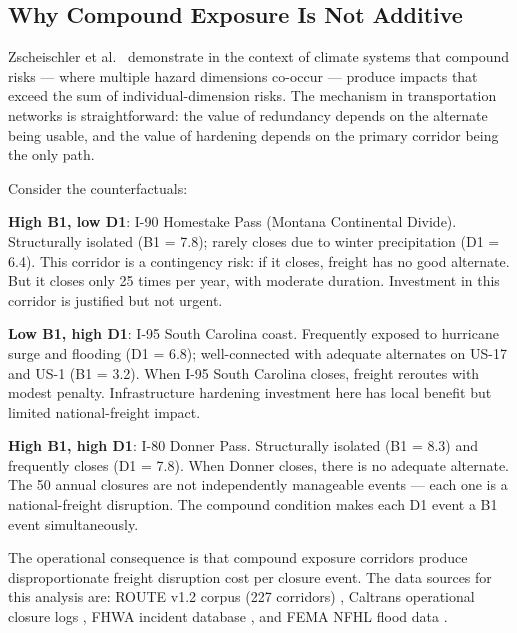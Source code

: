 \subsection{Why Compound Exposure Is Not Additive}

Zscheischler et al.\ \citep{Zscheischler2020} demonstrate in the context of climate systems that compound risks --- where multiple hazard dimensions co-occur --- produce impacts that exceed the sum of individual-dimension risks. The mechanism in transportation networks is straightforward: the value of redundancy depends on the alternate being usable, and the value of hardening depends on the primary corridor being the only path.

Consider the counterfactuals:

\textbf{High B1, low D1}: I-90 Homestake Pass (Montana Continental Divide). Structurally isolated (B1 = 7.8); rarely closes due to winter precipitation (D1 = 6.4). This corridor is a contingency risk: if it closes, freight has no good alternate. But it closes only 25 times per year, with moderate duration. Investment in this corridor is justified but not urgent.

\textbf{Low B1, high D1}: I-95 South Carolina coast. Frequently exposed to hurricane surge and flooding (D1 = 6.8); well-connected with adequate alternates on US-17 and US-1 (B1 = 3.2). When I-95 South Carolina closes, freight reroutes with modest penalty. Infrastructure hardening investment here has local benefit but limited national-freight impact.

\textbf{High B1, high D1}: I-80 Donner Pass. Structurally isolated (B1 = 8.3) and frequently closes (D1 = 7.8). When Donner closes, there is no adequate alternate. The 50 annual closures are not independently manageable events --- each one is a national-freight disruption. The compound condition makes each D1 event a B1 event simultaneously.

The operational consequence is that compound exposure corridors produce disproportionate freight disruption cost per closure event. The data sources for this analysis are: ROUTE v1.2 corpus (227 corridors) \citep{ROUTE_A2}, Caltrans operational closure logs \citep{Caltrans2023}, FHWA incident database \citep{FHWA_freight2023}, and FEMA NFHL flood data \citep{FEMA_NFHL}.
